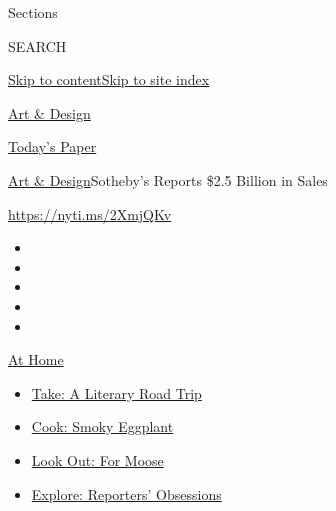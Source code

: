 Sections

SEARCH

\protect\hyperlink{site-content}{Skip to
content}\protect\hyperlink{site-index}{Skip to site index}

\href{https://www.nytimes3xbfgragh.onion/section/arts/design}{Art \&
Design}

\href{https://myaccount.nytimes3xbfgragh.onion/auth/login?response_type=cookie\&client_id=vi}{}

\href{https://www.nytimes3xbfgragh.onion/section/todayspaper}{Today's
Paper}

\href{/section/arts/design}{Art \& Design}\textbar{}Sotheby's Reports
\$2.5 Billion in Sales

\url{https://nyti.ms/2XmjQKv}

\begin{itemize}
\item
\item
\item
\item
\item
\end{itemize}

\href{https://www.nytimes3xbfgragh.onion/spotlight/at-home?action=click\&pgtype=Article\&state=default\&region=TOP_BANNER\&context=at_home_menu}{At
Home}

\begin{itemize}
\tightlist
\item
  \href{https://www.nytimes3xbfgragh.onion/2020/07/28/books/time-for-a-literary-road-trip.html?action=click\&pgtype=Article\&state=default\&region=TOP_BANNER\&context=at_home_menu}{Take:
  A Literary Road Trip}
\item
  \href{https://www.nytimes3xbfgragh.onion/2020/07/29/magazine/bored-with-your-home-cooking-some-smoky-eggplant-will-fix-that.html?action=click\&pgtype=Article\&state=default\&region=TOP_BANNER\&context=at_home_menu}{Cook:
  Smoky Eggplant}
\item
  \href{https://www.nytimes3xbfgragh.onion/2020/07/27/travel/moose-michigan-isle-royale.html?action=click\&pgtype=Article\&state=default\&region=TOP_BANNER\&context=at_home_menu}{Look
  Out: For Moose}
\item
  \href{https://www.nytimes3xbfgragh.onion/interactive/2020/at-home/even-more-reporters-editors-diaries-lists-recommendations.html?action=click\&pgtype=Article\&state=default\&region=TOP_BANNER\&context=at_home_menu}{Explore:
  Reporters' Obsessions}
\end{itemize}

